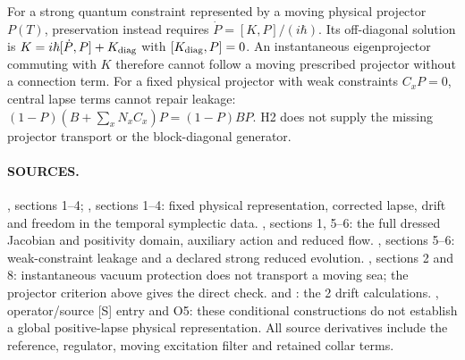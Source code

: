 For a strong quantum constraint represented by a moving physical
projector $P(T)$, preservation instead requires
$\dot P=[K,P]/(i\hbar)$.
Its off-diagonal solution is
$K=i\hbar[\dot P,P]+K_{\rm diag}$ with
$[K_{\rm diag},P]=0$.
An instantaneous eigenprojector commuting with $K$ therefore cannot
follow a moving prescribed projector without a connection term.
For a fixed physical projector with weak constraints $C_xP=0$,
central lapse terms cannot
repair leakage:
$(1-P)(B+\sum_xN_xC_x)P=(1-P)BP$.
H2 does not supply the missing projector transport or the
block-diagonal generator.

\paragraph*{SOURCES.}
\begingroup\footnotesize
{},
sections 1--4;
,
sections 1--4: fixed physical representation, corrected lapse,
drift and freedom in the temporal symplectic data.
,
sections 1, 5--6: the full dressed Jacobian and positivity domain,
auxiliary action and reduced flow.
,
sections 5--6: weak-constraint leakage and a declared strong
reduced evolution.
,
sections 2 and 8: instantaneous vacuum protection does not transport
a moving sea; the projector criterion above gives the direct check.
and
:
the 2 drift calculations.
,
operator/source [S] entry and O5: these conditional constructions
do not establish a global positive-lapse physical representation.
All source derivatives include the reference, regulator, moving
excitation filter and retained collar terms.
\endgroup
